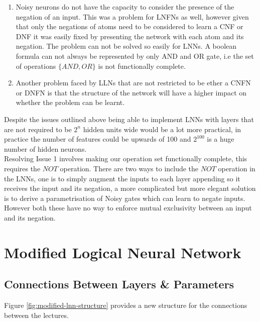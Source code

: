 \begin{enumerate}
	\item Noisy neurons do not have the capacity to consider the presence of the negation of an input. This was a problem for LNFNs as well, however given that only the negations of atoms need to be considered to learn a CNF or DNF it was easily fixed by presenting the network with each atom and its negation. The problem can not be solved so easily for LNNs. A boolean formula can not always be represented by only AND and OR gate, i.e the set of operations $\{AND, OR\}$ is not functionally complete. 
	
	\item Another problem faced by LLNs that are not restricted to be ether a CNFN or DNFN is that the structure of the network will have a higher impact on whether the problem can be learnt. 
\end{enumerate}

Despite the issues outlined above being able to implement LNNs with layers that are not required to be $2^n$ hidden units wide would be a lot more practical, in practice the number of features could be upwards of 100 and $2^{100}$ is a huge number of hidden neurons.\\

Resolving Issue 1 involves making our operation set functionally complete, this requires the $NOT$ operation. There are two ways to include the $NOT$ operation in the LNNs, one is to simply augment the inputs to each layer appending so it receives the input and its negation, a more complicated but more elegant solution is to derive a parametrisation of Noisy gates which can learn to negate inputs. However both these have no way to enforce mutual exclusivity between an input and its negation.\\

\section{Modified Logical Neural Network} \label{sec:modified-lnn}
\subsection{Connections Between Layers \& Parameters}
Figure \ref{fig:modified-lnn-structure} provides a new structure for the connections between the lectures.

